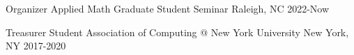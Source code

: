 

\begin{cvhonors}

  \cvhonor
    {Organizer} %
    {Applied Math Graduate Student Seminar} %
    {Raleigh, NC} %
    {2022-Now} %

  \cvhonor
    {Treasurer} %
    {Student Association of Computing @ New York University} %
    {New York, NY} %
    {2017-2020} %


\end{cvhonors}
